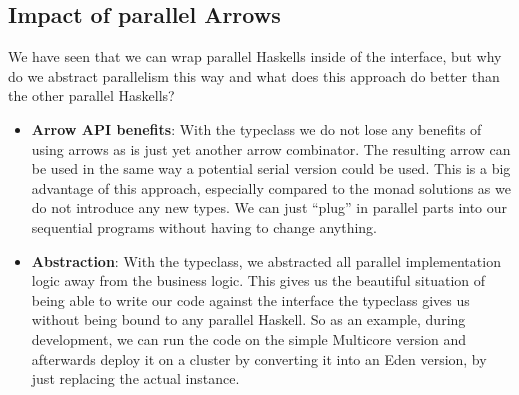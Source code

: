 \subsection{Impact of parallel Arrows}
We have seen that we can wrap parallel Haskells inside of the  interface, but why do we abstract parallelism this way and what does this approach do better than the other parallel Haskells?
\begin{itemize}
	\item \textbf{Arrow API benefits}:
	With the  typeclass we do not lose any benefits of using arrows as  is just yet another arrow combinator. The resulting arrow can be used in the same way a potential serial version could be used. This is a big advantage of this approach, especially compared to the monad solutions as we do not introduce any new types. We can just \enquote{plug} in parallel parts into our sequential programs without having to change anything.
	\item \textbf{Abstraction}:
	With the  typeclass, we abstracted all parallel implementation logic away from the business logic. This gives us the beautiful situation of being able to write our code against the interface the typeclass gives us without being bound to any parallel Haskell. So as an example, during development, we can run the code on the simple Multicore version and afterwards deploy it on a cluster by converting it into an Eden version, by just replacing the actual  instance.
\end{itemize}


